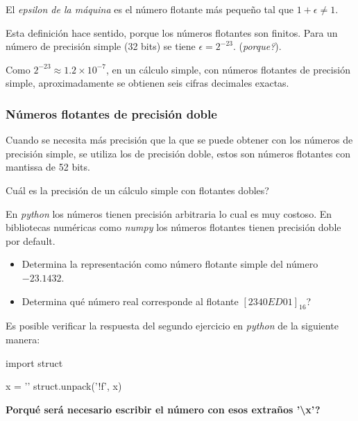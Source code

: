 \documentclass[spanish]{amsart}
\begin{document}
\begin{definition}
  El \emph{epsilon de la máquina} es el número flotante más pequeño tal que $1 + \epsilon \neq 1$.
\end{definition}

Esta definición hace sentido, porque los números flotantes son finitos. Para un número de precisión simple (32 bits) se tiene $\epsilon = 2^{-23}$. (\emph{porque?}).

\begin{remark}
  Como $2^{-23} \approx 1.2 \times 10^{-7}$, en un cálculo simple, con números flotantes de precisión simple, aproximadamente se obtienen seis cifras decimales exactas.
\end{remark}

\subsubsection{Números flotantes de precisión doble}

Cuando se necesita más precisión que la que se puede obtener con los números de precisión simple, se utiliza los de precisión doble, estos son números flotantes con mantissa de 52 bits. 

\begin{exercise}
  Cuál es la precisión de un cálculo simple con flotantes dobles?
\end{exercise}

\begin{remark}
  En \emph{python} los números tienen precisión arbitraria lo cual es muy costoso. En bibliotecas numéricas como \emph{numpy} los números flotantes tienen precisión doble por default.
\end{remark}

\begin{exercise}
  \begin{itemize}
  \item Determina la representación como número flotante simple del número $-23.1432$.
  \item Determina qué número real corresponde al flotante $[2340ED01]_{16}$?
  \end{itemize}
\end{exercise}

\begin{remark}
  Es posible verificar la respuesta del segundo ejercicio en \emph{python} de la siguiente manera:

  \begin{pythoncode}
    import struct

    x = '\xED{}'
    struct.unpack('!f', x)
  \end{pythoncode}

\textbf{Porqué será necesario escribir el número con esos extraños '\textbackslash x'?}
\end{remark}
\end{document}
